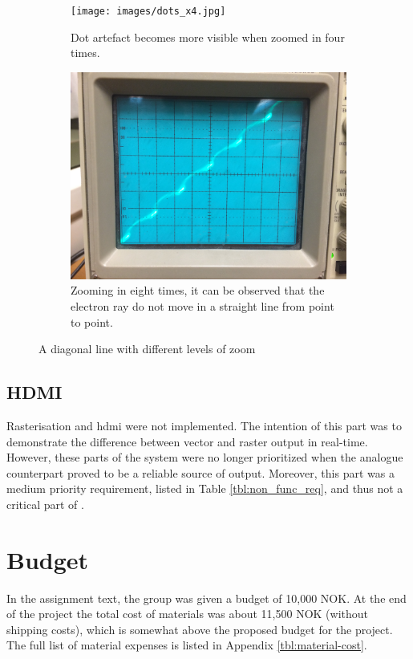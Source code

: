 \begin{figure}[h!]
	\ContinuedFloat
    \begin{subfigure}[b]{\textwidth}
		\centering
        \texttt{[image: images/dots\_x4.jpg]}
        \caption{Dot artefact becomes more visible when zoomed in four times.}
        \label{fig:dotx4}
    \end{subfigure}

    \begin{subfigure}[b]{\textwidth}
		\centering
        \includegraphics[height=0.4\textheight]{images/dots_x8.jpg}
        \caption{Zooming in eight times, it can be observed that the electron ray do not move in a straight line from point to point.}
        \label{fig:dotx8}
    \end{subfigure}
    \caption{A diagonal line with different levels of zoom}
    \label{fig:artefact-dots}
\end{figure}

\subsection{HDMI}
Rasterisation and \gls{hdmi} were not implemented.
The intention of this part was to demonstrate the difference between vector and raster output in real-time.
However, these parts of the system were no longer prioritized when the analogue counterpart proved to be a reliable source of output.
Moreover, this part was a medium priority requirement, listed in Table \ref{tbl:non_func_req}, and thus not a critical part of \vthreek.

\section{Budget}
In the assignment text, the group was given a budget of 10,000 NOK.
At the end of the project the total cost of materials was about 11,500 NOK (without shipping costs), which is somewhat above the proposed budget for the project.
The full list of material expenses is listed in Appendix \ref{tbl:material-cost}.
